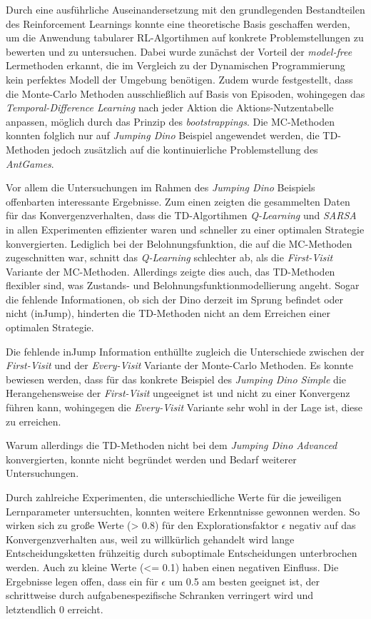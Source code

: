 Durch eine ausführliche Auseinandersetzung mit den grundlegenden Bestandteilen des Reinforcement Learnings konnte eine theoretische Basis geschaffen werden, um die Anwendung tabularer RL-Algortihmen auf konkrete Problemstellungen zu bewerten und zu untersuchen. Dabei wurde zunächst der Vorteil der \textit{model-free} Lermethoden erkannt, die im Vergleich zu der Dynamischen Programmierung kein perfektes Modell der Umgebung benötigen.
Zudem wurde festgestellt, dass die Monte-Carlo Methoden ausschließlich  auf Basis von Episoden, wohingegen das \textit{Temporal-Difference Learning} nach jeder Aktion die Aktions-Nutzentabelle anpassen, möglich durch das Prinzip des \textit{bootstrappings}. Die MC-Methoden konnten folglich nur auf \textit{Jumping Dino} Beispiel angewendet werden, die TD-Methoden jedoch zusätzlich auf die kontinuierliche Problemstellung des \textit{AntGames}.
\par 
Vor allem die Untersuchungen im Rahmen des \textit{Jumping Dino} Beispiels offenbarten interessante Ergebnisse. Zum einen zeigten die gesammelten Daten für das Konvergenzverhalten, dass die TD-Algortihmen \textit{Q-Learning} und \textit{SARSA} in allen Experimenten effizienter waren und schneller zu einer optimalen Strategie konvergierten. Lediglich bei der Belohnungsfunktion, die auf die MC-Methoden zugeschnitten war, schnitt das \textit{Q-Learning} schlechter ab, als die \textit{First-Visit} Variante der MC-Methoden. Allerdings zeigte dies auch, das TD-Methoden flexibler sind, was Zustands- und Belohnungsfunktionmodellierung angeht. Sogar die fehlende Informationen, ob sich der Dino derzeit im Sprung befindet oder nicht (\glqq inJump\grqq{}), hinderten die TD-Methoden nicht an dem Erreichen einer optimalen Strategie. 
\par 
Die fehlende \glqq inJump\grqq{} Information enthüllte zugleich die Unterschiede zwischen der \textit{First-Visit} und der \textit{Every-Visit} Variante der Monte-Carlo Methoden. Es konnte bewiesen werden, dass für das konkrete Beispiel des \textit{Jumping Dino Simple} die Herangehensweise der \textit{First-Visit} ungeeignet ist und nicht zu einer Konvergenz führen kann, wohingegen die \textit{Every-Visit} Variante sehr wohl in der Lage ist, diese zu erreichen.
\par 
Warum allerdings die TD-Methoden nicht bei dem \textit{Jumping Dino Advanced} konvergierten, konnte nicht begründet werden und Bedarf weiterer Untersuchungen.
\par 
Durch zahlreiche Experimenten, die unterschiedliche Werte für die jeweiligen Lernparameter untersuchten, konnten weitere Erkenntnisse gewonnen werden. So wirken sich zu große Werte (> 0.8) für den Explorationsfaktor $\epsilon$ negativ auf das Konvergenzverhalten aus, weil zu willkürlich gehandelt wird lange Entscheidungsketten frühzeitig durch suboptimale Entscheidungen unterbrochen werden. Auch zu kleine Werte (<= 0.1) haben einen negativen Einfluss. Die Ergebnisse legen offen, dass ein für $\epsilon$ um 0.5 am besten geeignet ist, der schrittweise durch aufgabenespezifische Schranken verringert wird und letztendlich 0 erreicht.
